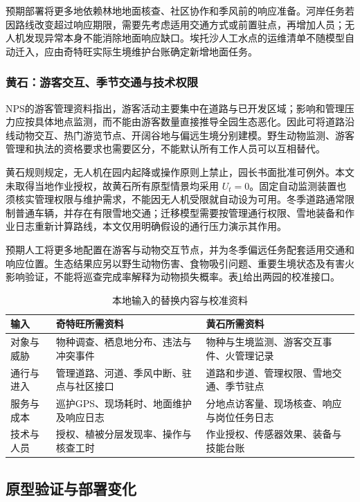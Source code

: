 \documentclass[UTF8,fontset=fandol,12pt,a4paper]{ctexart}
\begin{document}
预期部署将更多地依赖林地地面核查、社区协作和季风前的响应准备。河岸任务若因路线改变超过响应期限，需要先考虑适用交通方式或前置驻点，再增加人员；无人机发现异常本身不能消除地面响应缺口。埃托沙人工水点的运维清单不随模型自动迁入，应由奇特旺实际生境维护台账确定新增地面任务。

\subsubsection{黄石：游客交互、季节交通与技术权限}

NPS的游客管理资料指出，游客活动主要集中在道路与已开发区域；影响和管理压力应按具体地点监测，而不能由游客数量直接推导全园生态恶化\cite{visitor}。因此可将道路沿线动物交互、热门游览节点、开阔谷地与偏远生境分别建模。野生动物监测、游客管理和执法的资格要求也需要区分，不能默认所有工作人员可以互相替代。

黄石规则规定，无人机在园内起降或操作原则上禁止，园长书面批准可例外\cite{rules}。本文未取得当地作业授权，故黄石所有原型情景均采用 \(U_t=0\)。固定自动监测装置也须核实管理权限与维护需求，不能因无人机受限就自动设为可用。冬季道路通常限制普通车辆，并存在有限雪地交通\cite{conditions}；迁移模型需要按管理通行权限、雪地装备和作业日志重新计算路线，本文仅用明确假设的通行压力演示其作用。

预期人工将更多地配置在游客与动物交互节点，并为冬季偏远任务配套适用交通和响应位置。生态结果应另以野生动物伤害、食物吸引问题、重要生境状态及有害火影响验证，不能将巡查完成率解释为动物损失概率。表\ref{tab:q6data}给出两园的校准接口。

\begin{table}[htbp]
\centering
\caption{本地输入的替换内容与校准资料}
\label{tab:q6data}
\begin{tabularx}{\linewidth}{p{2.05cm}XX}
\toprule
输入 & 奇特旺所需资料 & 黄石所需资料\\
\midrule
对象与威胁 & 物种调查、栖息地分布、违法与冲突事件 & 物种与生境监测、游客交互事件、火管理记录\\
通行与进入 & 管理道路、河道、季风中断、驻点与社区接口 & 道路和步道、管理权限、雪地交通、季节驻点\\
服务与成本 & 巡护GPS、现场耗时、地面维护及响应日志 & 分地点访客量、现场核查、响应与岗位任务日志\\
技术与人员 & 授权、植被分层发现率、操作与核查工时 & 作业授权、传感器效果、装备与技能台账\\
\bottomrule
\end{tabularx}
\end{table}

\subsection{原型验证与部署变化}
\end{document}
